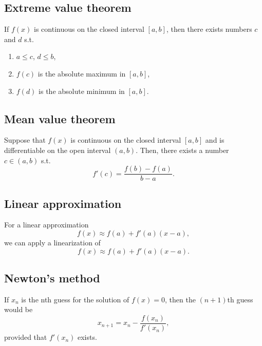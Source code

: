 \documentclass[main.tex]{subfiles}
\begin{document}
\begin{multicols}{2}
	\subsection*{Extreme value theorem}
	\begin{theorem}
	If \(f(x)\) is continuous on the closed interval \([a, b]\), then there exists numbers \(c\) and \(d\) s.t.
	\begin{enumerate}
		\item \(a \leq c\), \(d \leq b\),
		\item \(f(c)\) is the absolute maximum in \([a, b]\),
		\item \(f(d)\) is the absolute minimum in \([a, b]\).
	\end{enumerate}
	\end{theorem}

	\subsection*{Mean value theorem}
	\begin{theorem}
	Suppose that \(f(x)\) is continuous on the closed interval \([a, b]\) and is differentiable on the open interval \((a, b)\).
	Then, there exists a number \(c \in (a, b)\) s.t. \[f'(c) = \frac{f(b) - f(a)}{b - a}.\]
	\end{theorem}

	\subsection*{Linear approximation}
	For a linear approximation \[f(x) \approx f(a) + f'(a)(x - a),\] we can apply a linearization of \[f(x) \approx f(a) + f'(a)(x - a).\]

	\subsection*{Newton's method}
	\begin{definition}
	If \(x_n\) is the nth guess for the solution of \(f(x) = 0\), then the \((n + 1)\)th guess would be \[x_{n+1} = x_n - \frac{f(x_n)}{f'(x_n)},\] provided that \(f'(x_n)\) exists.
	\end{definition}
\end{multicols}
\end{document}
